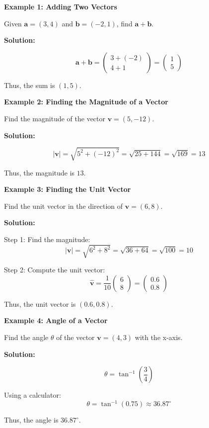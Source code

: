 \begin{flushleft}
	\textbf{Example 1: Adding Two Vectors}
	
	Given \( \mathbf{a} = (3, 4) \) and \( \mathbf{b} = (-2, 1) \), find \( \mathbf{a} + \mathbf{b} \).
	
	\textbf{Solution:} \vspace{0.2cm}
	
	\[
	\mathbf{a} + \mathbf{b} = \begin{pmatrix} 3 + (-2) \\ 4 + 1 \end{pmatrix} = \begin{pmatrix} 1 \\ 5 \end{pmatrix}
	\]
	
	Thus, the sum is \( \boxed{(1,5)} \).
\end{flushleft}

\begin{flushleft}
	\textbf{Example 2: Finding the Magnitude of a Vector}
	
	Find the magnitude of the vector \( \mathbf{v} = (5, -12) \).
	
	\textbf{Solution:} \vspace{0.2cm}
	
	\[
	|\mathbf{v}| = \sqrt{5^2 + (-12)^2} = \sqrt{25 + 144} = \sqrt{169} = 13
	\]
	
	Thus, the magnitude is \( \boxed{13} \).
\end{flushleft}

\begin{flushleft}
	\textbf{Example 3: Finding the Unit Vector}
	
	Find the unit vector in the direction of \( \mathbf{v} = (6, 8) \).
	
	\textbf{Solution:} \vspace{0.2cm}
	
	Step 1: Find the magnitude:
	\[
	|\mathbf{v}| = \sqrt{6^2 + 8^2} = \sqrt{36 + 64} = \sqrt{100} = 10
	\]
	
	Step 2: Compute the unit vector:
	\[
	\hat{\mathbf{v}} = \frac{1}{10} \begin{pmatrix} 6 \\ 8 \end{pmatrix} = \begin{pmatrix} 0.6 \\ 0.8 \end{pmatrix}
	\]
	
	Thus, the unit vector is \( \boxed{(0.6, 0.8)} \).
\end{flushleft}

\begin{flushleft}
	\textbf{Example 4: Angle of a Vector}
	
	Find the angle \( \theta \) of the vector \( \mathbf{v} = (4, 3) \) with the x-axis.
	
	\textbf{Solution:} \vspace{0.2cm}
	
	\[
	\theta = \tan^{-1} \left(\frac{3}{4} \right)
	\]
	
	Using a calculator:
	\[
	\theta = \tan^{-1}(0.75) \approx 36.87^\circ
	\]
	
	Thus, the angle is \( \boxed{36.87^\circ} \).
\end{flushleft}
